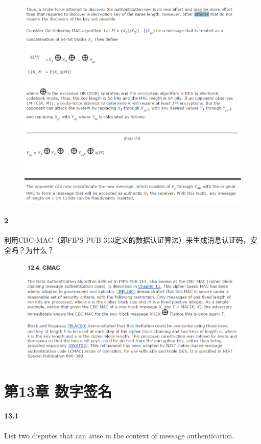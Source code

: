 \documentclass[UTF8]{article}
\begin{document}
\begin{figure}[htbp]
	\centering
	\includegraphics[width=1\textwidth]{img/128.png}
\end{figure}
\paragraph{2}
利用CBC-MAC（即FIPS PUB 313定义的数据认证算法）来生成消息认证码，安全吗？为什么？

\begin{figure}[htbp]
	\centering
	\includegraphics[width=1\textwidth]{img/124.png}
\end{figure}
\section{第13章 数字签名}
\paragraph{13.1}
List two disputes that can arise in the context of message authentication.
\end{document}
